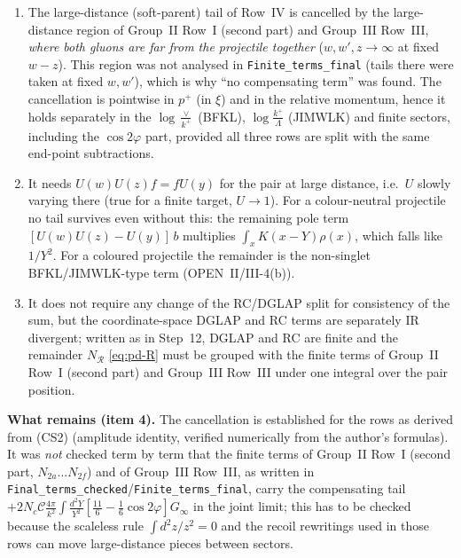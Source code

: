 \documentclass[10pt]{article}
\begin{document}
\begin{enumerate}
\item The large-distance (soft-parent) tail of Row~IV is cancelled by the large-distance region of Group~II Row~I (second part) and Group~III Row~III, \emph{where both gluons are far from the projectile together} ($w,w',z\to\infty$ at fixed $w-z$). This region was not analysed in \texttt{Finite\_terms\_final} (tails there were taken at fixed $w,w'$), which is why ``no compensating term'' was found. The cancellation is pointwise in $p^{+}$ (in $\xi$) and in the relative momentum, hence it holds separately in the $\log\frac{\vee}{k^{+}}$ (BFKL), $\log\frac{k^{+}}{\Lambda}$ (JIMWLK) and finite sectors, including the $\cos2\varphi$ part, provided all three rows are split with the same end-point subtractions.
\item It needs $U(w)U(z)f=fU(y)$ for the pair at large distance, i.e.\ $U$ slowly varying there (true for a finite target, $U\to1$). For a colour-neutral projectile no tail survives even without this: the remaining pole term $[U(w)U(z)-U(y)]\,b$ multiplies $\int_{x}K(x-Y)\rho(x)$, which falls like $1/Y^{2}$. For a coloured projectile the remainder is the non-singlet BFKL/JIMWLK-type term (OPEN~II/III-4(b)).
\item It does not require any change of the RC/DGLAP split for consistency of the sum, but the coordinate-space DGLAP and RC terms are separately IR divergent; written as in Step~12, DGLAP and RC are finite and the remainder $N_{\mathcal{R}}$ \eqref{eq:pd-R} must be grouped with the finite terms of Group~II Row~I (second part) and Group~III Row~III under one integral over the pair position.
\end{enumerate}
\noindent\textbf{What remains (item 4).} The cancellation is established for the rows as derived from (CS2) (amplitude identity, verified numerically from the author's formulas). It was \emph{not} checked term by term that the finite terms of Group~II Row~I (second part, $N_{2a}\dots N_{2f}$) and of Group~III Row~III, as written in \texttt{Final\_terms\_checked}/\texttt{Finite\_terms\_final}, carry the compensating tail $+2N_{c}\mathcal{C}\frac{4\pi}{k^{2}}\int\frac{d^{2}Y}{Y^{2}}[\frac{11}{6}-\frac16\cos2\varphi]G_{\infty}$ in the joint limit; this has to be checked because the scaleless rule $\int d^{2}z/z^{2}=0$ and the recoil rewritings used in those rows can move large-distance pieces between sectors.
\end{document}
